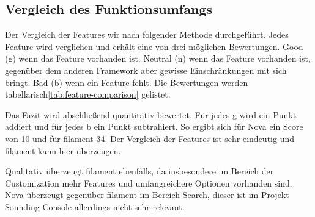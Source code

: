 \subsection{Vergleich des Funktionsumfangs}
Der Vergleich der Features wir nach folgender Methode durchgeführt.
Jedes Feature wird verglichen und erhält eine von drei möglichen Bewertungen.
Good (g) wenn das Feature vorhanden ist.
Neutral (n) wenn das Feature vorhanden ist, gegenüber dem anderen Framework aber gewisse Einschränkungen mit sich bringt.
Bad (b) wenn ein Feature fehlt.
Die Bewertungen werden tabellarisch\ref{tab:feature-comparison} gelistet.

Das Fazit wird abschließend quantitativ bewertet.
Für jedes g wird ein Punkt addiert und für jedes b ein Punkt subtrahiert.
So ergibt sich für Nova ein Score von 10 und für filament 34.
Der Vergleich der Features ist sehr eindeutig und filament kann hier überzeugen.

Qualitativ überzeugt filament ebenfalls, da insbesondere im Bereich der Customization mehr Features und umfangreichere Optionen vorhanden sind.
Nova überzeugt gegenüber filament im Bereich Search, dieser ist im Projekt Sounding Console allerdings nicht sehr relevant.


